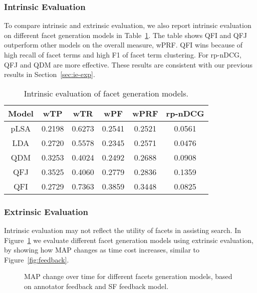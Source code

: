 \subsubsection{Intrinsic Evaluation}
To compare intrinsic and extrinsic evaluation, we also report intrinsic evaluation on different facet generation models in Table~\ref{tab:intrinsic}. The table shows QFI and QFJ  outperform other models on the overall measure, wPRF. QFI wins because of high recall of facet terms and high F1 of facet term clustering. For rp-nDCG, QFJ and QDM are more effective. These results are consistent with our previous results in Section~\ref{sec:ie-exp}.  
\begin{table}[H]
\centering
\caption{Intrinsic evaluation of facet generation models.}
\label{tab:intrinsic}
\begin{tabular}{|c|c|c|c|c|c|} \hline
Model & wTP & wTR & wPF & wPRF & rp-nDCG\\ \hline
pLSA & 0.2198 & 0.6273 & 0.2541 & 0.2521 & 0.0561\\ \hline
LDA & 0.2720 & 0.5578 & 0.2345 & 0.2571 & 0.0476\\ \hline
QDM & 0.3253 & 0.4024 & 0.2492 & 0.2688 & 0.0908\\ \hline
QFJ & 0.3525 & 0.4060 & 0.2779 & 0.2836 & 0.1359\\ \hline
QFI & 0.2729 & 0.7363 & 0.3859 & 0.3448 & 0.0825\\ \hline
\end{tabular}
\end{table}

\subsubsection{Extrinsic Evaluation} \label{sec:ee-cmp-facet-extrinsic}
Intrinsic evaluation may not reflect the utility of facets in assisting search. In Figure~\ref{fig:cmp-facet} we evaluate different facet generation models using extrinsic evaluation, by showing how MAP changes as time cost increases, similar to Figure~\ref{fig:feedback}.

\begin{figure}[H]
\centering
\caption{MAP change over time for different facets generation models, based on annotator feedback and SF feedback model.}
\label{fig:cmp-facet}
\end{figure}

